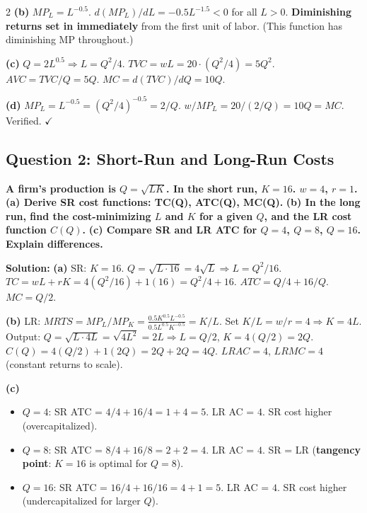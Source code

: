 \documentclass[10pt,a4paper]{article}
\begin{document}
\begin{multicols}{2}
\textbf{(b)} $MP_L = L^{-0.5}$. $d(MP_L)/dL = -0.5 L^{-1.5} < 0$ for all $L>0$. \textbf{Diminishing returns set in immediately} from the first unit of labor. (This function has diminishing MP throughout.)

\textbf{(c)} $Q = 2L^{0.5} \Rightarrow L = Q^2/4$. $TVC = wL = 20 \cdot (Q^2/4) = 5Q^2$.
$AVC = TVC/Q = 5Q$. $MC = d(TVC)/dQ = 10Q$.

\textbf{(d)} $MP_L = L^{-0.5} = (Q^2/4)^{-0.5} = 2/Q$. $w/MP_L = 20 / (2/Q) = 10Q = MC$. Verified. $\checkmark$

\vspace{0.2cm}

\subsection*{Question 2: Short-Run and Long-Run Costs}
\textbf{A firm's production is $Q = \sqrt{LK}$. In the short run, $K = 16$. $w = 4$, $r = 1$.}
\textbf{(a) Derive SR cost functions: TC(Q), ATC(Q), MC(Q).}
\textbf{(b) In the long run, find the cost-minimizing $L$ and $K$ for a given $Q$, and the LR cost function $C(Q)$.}
\textbf{(c) Compare SR and LR ATC for $Q = 4$, $Q = 8$, $Q = 16$. Explain differences.}

\vspace{0.05cm}
\textbf{Solution:}
\vspace{0.05cm}
\textbf{(a)} SR: $K=16$. $Q = \sqrt{L \cdot 16} = 4\sqrt{L} \Rightarrow L = Q^2/16$.
$TC = wL + rK = 4(Q^2/16) + 1(16) = Q^2/4 + 16$.
$ATC = Q/4 + 16/Q$. $MC = Q/2$.

\textbf{(b)} LR: $MRTS = MP_L/MP_K = \frac{0.5 K^{0.5} L^{-0.5}}{0.5 L^{0.5} K^{-0.5}} = K/L$. Set $K/L = w/r = 4 \Rightarrow K = 4L$.
Output: $Q = \sqrt{L \cdot 4L} = \sqrt{4L^2} = 2L \Rightarrow L = Q/2$, $K = 4(Q/2) = 2Q$.
$C(Q) = 4(Q/2) + 1(2Q) = 2Q + 2Q = 4Q$.
$LRAC = 4$, $LRMC = 4$ (constant returns to scale).

\textbf{(c)}
\begin{itemize}[nosep]
    \item $Q=4$: SR ATC = $4/4 + 16/4 = 1+4 = 5$. LR AC = $4$. SR cost higher (overcapitalized).
    \item $Q=8$: SR ATC = $8/4 + 16/8 = 2+2 = 4$. LR AC = $4$. SR = LR (\textbf{tangency point}: $K=16$ is optimal for $Q=8$).
    \item $Q=16$: SR ATC = $16/4 + 16/16 = 4+1 = 5$. LR AC = $4$. SR cost higher (undercapitalized for larger $Q$).
\end{itemize}


\end{multicols}
\end{document}
